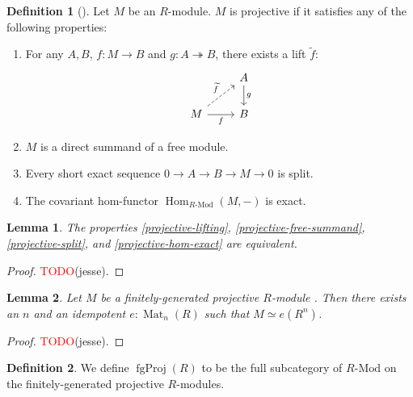 \documentclass[11pt]{article}
\newcommand{\remph}[1]{\textcolor{red}{#1}}
\newcommand{\TODO}{\remph{TODO}}
\newcommand{\Hom}{\operatorname{Hom}}
\newcommand{\Mat}{\operatorname{Mat}}
\newcommand{\fgProj}{\operatorname{fgProj}}
\theoremstyle{plain}
\newtheorem{lemma}{Lemma}[section]
\theoremstyle{definition}
\newtheorem{definition}{Definition}[section]
\begin{document}
\begin{definition}[\cite{nlab:projective_module}]\label{def-projective}
  Let \(M\) be an \(R\)-module. \(M\) is projective if it satisfies any of the following properties:

  \begin{enumerate}
  \item\label{projective-lifting} For any \(A, B\), \(f : M \to B\) and \(g : A \twoheadrightarrow B\), there exists a lift \(\widetilde{f}\):
    \[
      \begin{tikzcd}
        & A \arrow{d}{g}\\
        M \arrow[dashed]{ur}{\widetilde{f}}\arrow[swap]{r}{f}& B
      \end{tikzcd}
    \]
  \item \label{projective-free-summand} \(M\) is a direct summand of a free module.

    \item \label{projective-split} Every short exact sequence \(0 \to A \to B \to M \to 0\) is split.

    \item \label{projective-hom-exact} The covariant hom-functor \(\Hom_{R\text{-Mod}}(M, -)\) is exact.
  \end{enumerate}
\end{definition}

\begin{lemma}\label{lemma-projective-equivalent}
  The properties \ref{projective-lifting}, \ref{projective-free-summand}, \ref{projective-split}, and \ref{projective-hom-exact} are equivalent.
\end{lemma}
\begin{proof}
  \TODO(jesse).
\end{proof}

\begin{lemma} \label{lemma-fg-projective-idempotent}
  Let \(M\) be a finitely-generated projective \(R\)-module . Then there exists an \(n\) and an idempotent \(e : \Mat_n(R)\) such that \(M \simeq e(R^n)\).
\end{lemma}

\begin{proof}
  \TODO(jesse).
\end{proof}

\begin{definition} \label{def-category-projective-modules}
  We define \(\fgProj(R)\) to be the full subcategory of \(R\text{-Mod}\) on the finitely-generated projective \(R\)-modules.
\end{definition}
\end{document}
